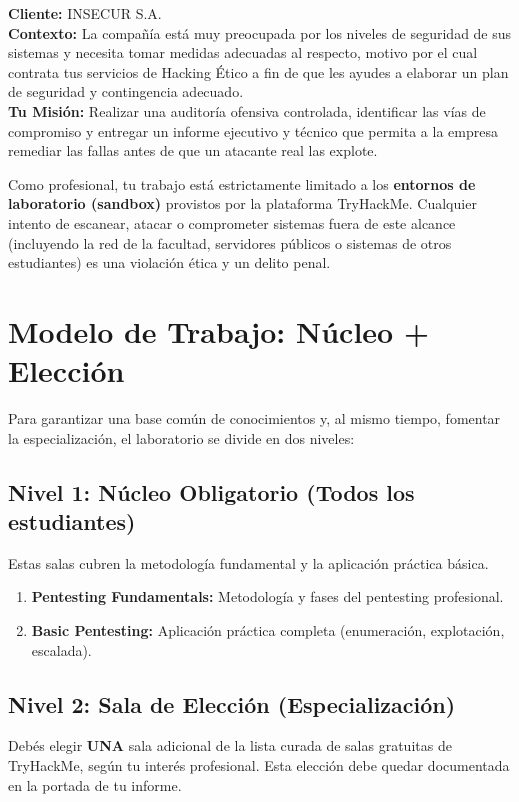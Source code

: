 \documentclass[11pt,a4paper]{article}
\begin{document}
\begin{reflexion}
\textbf{Cliente:} INSECUR S.A.\\
\textbf{Contexto:} La compañía está muy preocupada por los niveles de seguridad de sus sistemas y necesita tomar medidas adecuadas al respecto, motivo por el cual contrata tus servicios de Hacking Ético a fin de que les ayudes a elaborar un plan de seguridad y contingencia adecuado.\\
\textbf{Tu Misión:} Realizar una auditoría ofensiva controlada, identificar las vías de compromiso y entregar un informe ejecutivo y técnico que permita a la empresa remediar las fallas antes de que un atacante real las explote.
\end{reflexion}

\begin{alerta}
Como profesional, tu trabajo está estrictamente limitado a los \textbf{entornos de laboratorio (sandbox)} provistos por la plataforma TryHackMe. Cualquier intento de escanear, atacar o comprometer sistemas fuera de este alcance (incluyendo la red de la facultad, servidores públicos o sistemas de otros estudiantes) es una violación ética y un delito penal.
\end{alerta}

\section{Modelo de Trabajo: Núcleo + Elección}
Para garantizar una base común de conocimientos y, al mismo tiempo, fomentar la especialización, el laboratorio se divide en dos niveles:

\subsection{Nivel 1: Núcleo Obligatorio (Todos los estudiantes)}
Estas salas cubren la metodología fundamental y la aplicación práctica básica.
\begin{enumerate}[leftmargin=*]
  \item \textbf{Pentesting Fundamentals:} Metodología y fases del pentesting profesional.
  \item \textbf{Basic Pentesting:} Aplicación práctica completa (enumeración, explotación, escalada).
\end{enumerate}

\subsection{Nivel 2: Sala de Elección (Especialización)}
Debés elegir \textbf{UNA} sala adicional de la lista curada de salas gratuitas de TryHackMe, según tu interés profesional. Esta elección debe quedar documentada en la portada de tu informe.
\end{document}

